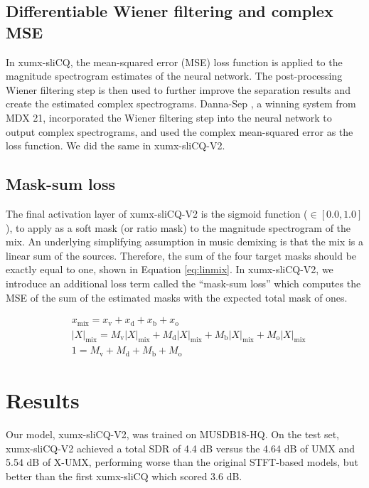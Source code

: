 \documentclass{INTERSPEECH2023}
\begin{document}
\subsection{Differentiable Wiener filtering and complex MSE}

In xumx-sliCQ, the mean-squared error (MSE) loss function is applied to the magnitude spectrogram estimates of the neural network. The post-processing Wiener filtering step is then used to further improve the separation results and create the estimated complex spectrograms. Danna-Sep \cite{yu2021dannasep}, a winning system from MDX 21, incorporated the Wiener filtering step into the neural network to output complex spectrograms, and used the complex mean-squared error as the loss function. We did the same in xumx-sliCQ-V2.

\subsection{Mask-sum loss}

The final activation layer of xumx-sliCQ-V2 is the sigmoid function ($\in [0.0, 1.0]$), to apply as a soft mask (or ratio mask) to the magnitude spectrogram of the mix. An underlying simplifying assumption in music demixing is that the mix is a linear sum of the sources. Therefore, the sum of the four target masks should be exactly equal to one, shown in Equation \eqref{eq:linmix}. In xumx-sliCQ-V2, we introduce an additional loss term called the ``mask-sum loss'' which computes the MSE of the sum of the estimated masks with the expected total mask of ones.

\begin{align}
        & x_{\text{mix}} = x_{\text{v}} + x_{\text{d}} + x_{\text{b}} + x_{\text{o}} \nonumber \\
        & |X|_{\text{mix}} = M_{\text{v}}|X|_{\text{mix}} + M_{\text{d}}|X|_{\text{mix}} + M_{\text{b}}|X|_{\text{mix}} + M_{\text{o}}|X|_{\text{mix}} \nonumber \\
        & 1 = M_{\text{v}} + M_{\text{d}} + M_{\text{b}} + M_{\text{o}} \label{eq:linmix}
\end{align}

\section{Results}

Our model, xumx-sliCQ-V2, was trained on MUSDB18-HQ. On the test set, xumx-sliCQ-V2 achieved a total SDR of 4.4 dB versus the 4.64 dB of UMX and 5.54 dB of X-UMX, performing worse than the original STFT-based models, but better than the first xumx-sliCQ which scored 3.6 dB.
\end{document}
